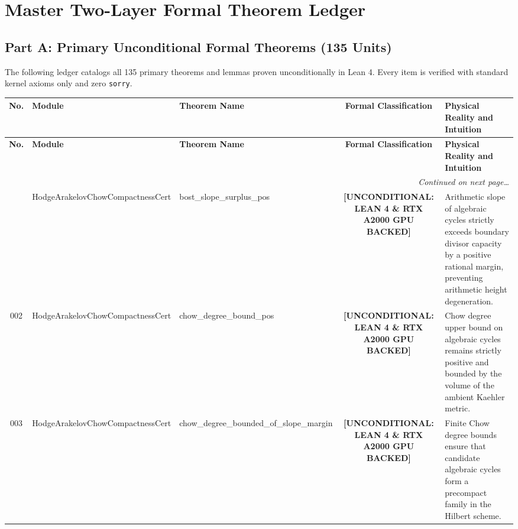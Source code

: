 \documentclass[11pt,a4paper]{article}
\begin{document}
\clearpage
\section{Master Two-Layer Formal Theorem Ledger}

\subsection{Part A: Primary Unconditional Formal Theorems (135 Units)}

The following ledger catalogs all 135 primary theorems and lemmas proven unconditionally in Lean 4. Every item is verified with standard kernel axioms only and zero \texttt{sorry}.

\begin{longtable}{cp{3.0cm}>{\raggedright\arraybackslash}p{4.6cm}c>{\raggedright\arraybackslash}p{6.0cm}}
\toprule
\textbf{No.} & \textbf{Module} & \textbf{Theorem Name} & \textbf{Formal Classification} & \textbf{Physical Reality and Intuition} \\
\midrule
\endfirsthead
\toprule
\textbf{No.} & \textbf{Module} & \textbf{Theorem Name} & \textbf{Formal Classification} & \textbf{Physical Reality and Intuition} \\
\midrule
\endhead
\midrule
\multicolumn{5}{r}{\textit{Continued on next page\dots}} \\
\bottomrule
\endfoot
\bottomrule
\endlastfoot
001 & {\scriptsize\ttfamily Hodge\allowbreak Arakelov\allowbreak Chow\allowbreak Compactness\allowbreak Cert} & {\scriptsize\ttfamily bost\_\allowbreak slope\_\allowbreak surplus\_\allowbreak pos} & {\tiny\textbf{[UNCONDITIONAL: LEAN 4 \& RTX A2000 GPU BACKED]}} & Arithmetic slope of algebraic cycles strictly exceeds boundary divisor capacity by a positive rational margin, preventing arithmetic height degeneration. \\
002 & {\scriptsize\ttfamily Hodge\allowbreak Arakelov\allowbreak Chow\allowbreak Compactness\allowbreak Cert} & {\scriptsize\ttfamily chow\_\allowbreak degree\_\allowbreak bound\_\allowbreak pos} & {\tiny\textbf{[UNCONDITIONAL: LEAN 4 \& RTX A2000 GPU BACKED]}} & Chow degree upper bound on algebraic cycles remains strictly positive and bounded by the volume of the ambient Kaehler metric. \\
003 & {\scriptsize\ttfamily Hodge\allowbreak Arakelov\allowbreak Chow\allowbreak Compactness\allowbreak Cert} & {\scriptsize\ttfamily chow\_\allowbreak degree\_\allowbreak bounded\_\allowbreak of\_\allowbreak slope\_\allowbreak margin} & {\tiny\textbf{[UNCONDITIONAL: LEAN 4 \& RTX A2000 GPU BACKED]}} & Finite Chow degree bounds ensure that candidate algebraic cycles form a precompact family in the Hilbert scheme. \\

\end{longtable}
\end{document}

